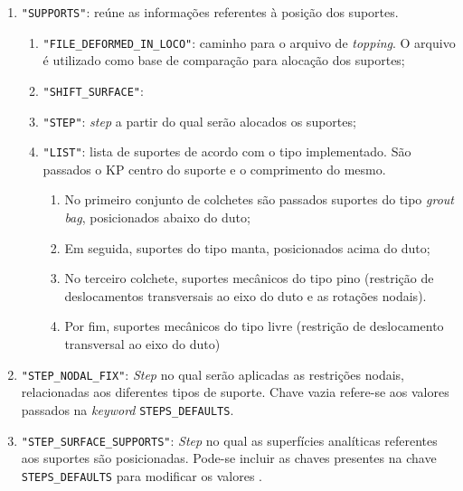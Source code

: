 \begin{enumerate}
    \item \texttt{"SUPPORTS"}: reúne as informações referentes à posição dos suportes.
    \begin{enumerate}
        \item \texttt{"FILE\_DEFORMED\_IN\_LOCO"}: caminho para o arquivo de \textit{topping}. O arquivo é utilizado como base de comparação para alocação dos suportes;
        \item \texttt{"SHIFT\_SURFACE"}: %
        \item \texttt{"STEP"}: \textit{step} a partir do qual serão alocados os suportes;
        \item \texttt{"LIST"}: lista de suportes de acordo com o tipo implementado. São passados o KP centro do suporte e o comprimento do mesmo.
        \begin{enumerate}
            \item No primeiro conjunto de colchetes são passados suportes do tipo \textit{grout bag}, posicionados abaixo do duto;
            \item Em seguida, suportes do tipo manta, posicionados acima do duto;
            \item No terceiro colchete, suportes mecânicos do tipo pino (restrição de deslocamentos transversais ao eixo do duto e as rotações nodais).
            \item Por fim, suportes mecânicos do tipo livre (restrição de deslocamento transversal ao eixo do duto)
        \end{enumerate}
    \end{enumerate}
    \item \texttt{"STEP\_NODAL\_FIX"}: \textit{Step} no qual serão aplicadas as restrições nodais, relacionadas aos diferentes tipos de suporte. Chave vazia refere-se aos valores passados na \textit{keyword} \texttt{STEPS\_DEFAULTS}.
    \item \texttt{"STEP\_SURFACE\_SUPPORTS"}: \textit{Step} no qual as superfícies analíticas referentes aos suportes são posicionadas. Pode-se incluir as chaves presentes na chave \texttt{STEPS\_DEFAULTS} para modificar os valores .
\end{enumerate}

